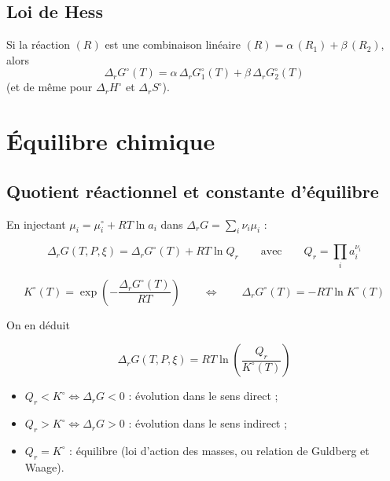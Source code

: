 \documentclass[11pt,a4paper]{article}
\newcommand{\rG}{\Delta_r G}
\newcommand{\rH}{\Delta_r H}
\newcommand{\rS}{\Delta_r S}
\newcommand{\std}{^\circ}
\begin{document}
\subsection{Loi de Hess}

\begin{resultat}[title={Loi de Hess}]
Si la réaction $(R)$ est une combinaison linéaire
$(R) = \alpha\,(R_1) + \beta\,(R_2)$, alors
\[
  \rG\std(T) = \alpha\,\rG\std_1(T) + \beta\,\rG\std_2(T)
\]
(et de même pour $\rH\std$ et $\rS\std$).
\end{resultat}

\section{Équilibre chimique}

\subsection{Quotient réactionnel et constante d'équilibre}

En injectant $\mu_i = \mu_i\std + RT\ln a_i$ dans $\rG = \sum_i \nu_i \mu_i$ :

\begin{resultat}[title={Expression de $\rG$}]
\[
  \rG(T,P,\xi) = \rG\std(T) + RT\ln Q_r
  \qquad\text{avec}\qquad
  Q_r = \prod_i a_i^{\nu_i}
\]
\end{resultat}

\begin{definition}[title={Constante d'équilibre}]
\[
  K\std(T) = \exp\!\left(-\frac{\rG\std(T)}{RT}\right)
  \qquad\Longleftrightarrow\qquad
  \rG\std(T) = -RT\ln K\std(T)
\]
\end{definition}

On en déduit
\begin{resultat}
\[
  \rG(T,P,\xi) = RT\ln\!\left(\frac{Q_r}{K\std(T)}\right)
\]
\begin{itemize}[nosep]
  \item $Q_r < K\std \Leftrightarrow \rG < 0$ : évolution dans le sens direct ;
  \item $Q_r > K\std \Leftrightarrow \rG > 0$ : évolution dans le sens indirect ;
  \item $Q_r = K\std$ : équilibre (loi d'action des masses, ou relation de Guldberg et Waage).
\end{itemize}
\end{resultat}
\end{document}

